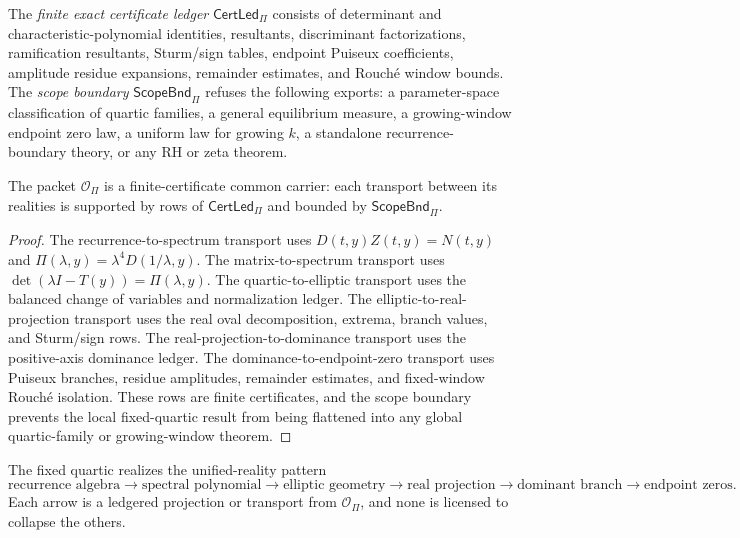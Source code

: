 \begin{definition}
\label{def:unified-reality-quartic-certificate-ledger-scope}
The \emph{finite exact certificate ledger} $\mathsf{CertLed}_{\Pi}$
consists of determinant and characteristic-polynomial identities,
resultants, discriminant factorizations, ramification resultants,
Sturm/sign tables, endpoint Puiseux coefficients, amplitude residue
expansions, remainder estimates, and Rouch\'e window bounds. The
\emph{scope boundary} $\mathsf{ScopeBnd}_{\Pi}$ refuses the following
exports: a parameter-space classification of quartic families, a
general equilibrium measure, a growing-window endpoint zero law, a
uniform law for growing $k$, a standalone recurrence-boundary theory,
or any RH or zeta theorem.
\end{definition}

\begin{theorem}
\label{thm:unified-reality-quartic-finite-certificate-common-carrier}
The packet $\mathcal O_{\Pi}$ is a finite-certificate common carrier:
each transport between its realities is supported by rows of
$\mathsf{CertLed}_{\Pi}$ and bounded by $\mathsf{ScopeBnd}_{\Pi}$.
\end{theorem}

\begin{proof}
The recurrence-to-spectrum transport uses $D(t,y)Z(t,y)=N(t,y)$ and
$\Pi(\lambda,y)=\lambda^4D(1/\lambda,y)$. The matrix-to-spectrum
transport uses $\det(\lambda I-T(y))=\Pi(\lambda,y)$. The
quartic-to-elliptic transport uses the balanced change of variables and
normalization ledger. The elliptic-to-real-projection transport uses the
real oval decomposition, extrema, branch values, and Sturm/sign rows.
The real-projection-to-dominance transport uses the positive-axis
dominance ledger. The dominance-to-endpoint-zero transport uses Puiseux
branches, residue amplitudes, remainder estimates, and fixed-window
Rouch\'e isolation. These rows are finite certificates, and the scope
boundary prevents the local fixed-quartic result from being flattened
into any global quartic-family or growing-window theorem.
\end{proof}

\begin{theorem}
\label{thm:unified-reality-quartic-spectral-common-carrier-principle}
The fixed quartic realizes the unified-reality pattern
$$
\text{recurrence algebra}
\to
\text{spectral polynomial}
\to
\text{elliptic geometry}
\to
\text{real projection}
\to
\text{dominant branch}
\to
\text{endpoint zeros}.
$$
Each arrow is a ledgered projection or transport from
$\mathcal O_{\Pi}$, and none is licensed to collapse the others.
\end{theorem}

